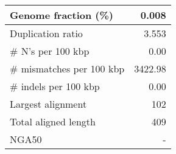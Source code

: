 \documentclass[12pt,a4paper]{article}
\begin{document}
\begin{table}[ht]
\begin{center}
\begin{tabular}{|l*{1}{|r}|}
Genome fraction (\%) & 0.008 \\ \hline
Duplication ratio & 3.553 \\ \hline
\# N's per 100 kbp & 0.00 \\ \hline
\# mismatches per 100 kbp & 3422.98 \\ \hline
\# indels per 100 kbp & 0.00 \\ \hline
Largest alignment & 102 \\ \hline
Total aligned length & 409 \\ \hline
NGA50 & - \\ \hline
\end{tabular}
\end{center}
\end{table}
\end{document}

